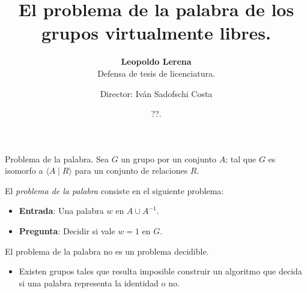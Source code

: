 \documentclass[aspectratio=169, 11pt]{beamer}
\title{El problema de la palabra de los grupos virtualmente libres.}
\subtitle{\textbf{Leopoldo Lerena} \\
		Defensa de tesis de licenciatura.}
\date{??.}
\author{Director: Iván Sadofschi Costa}
\institute{Universidad de Buenos Aires}
\begin{document}
	\maketitle

	
	
	
	\begin{frame}[fragile]{Problema de la palabra.}
		Sea $G$ un grupo \fg por un conjunto $A$; 
		tal que $G$ es isomorfo a $\langle A \mid R \rangle$ para un conjunto de relaciones $R$.
		
		El \emph{problema de la palabra} consiste en el siguiente problema:
	
		\begin{itemize}
					\item 
						\textbf{Entrada}: Una palabra $w$ en $A \cup A^{-1}$.
					
					\item 
						\textbf{Pregunta}: Decidir si vale $w=1$ en $G$.
		\end{itemize}

		El problema de la palabra no es un problema \alert{decidible}.
		\begin{itemize}
			\item 
				Existen grupos tales que resulta imposible construir un algoritmo que decida si una palabra representa la identidad o no.
		\end{itemize}
		

	\end{frame}
\end{document}
